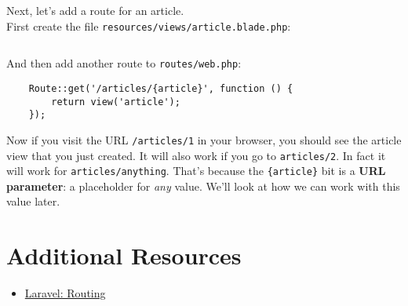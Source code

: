 Next, let's add a route for an article.
\\

First create the file \texttt{resources/views/article.blade.php}:

\inputminted{html}{05-routing/figures/02-article.html}

And then add another route to \texttt{routes/web.php}:

\begin{verbatim}
    Route::get('/articles/{article}', function () {
        return view('article');
    });
\end{verbatim}

Now if you visit the URL \texttt{/articles/1} in your browser, you should see the article view that you just created. It will also work if you go to \texttt{articles/2}. In fact it will work for \texttt{articles/anything}. That's because the \texttt{\{article\}} bit is a \textbf{URL parameter}: a placeholder for \textit{any} value. We'll look at how we can work with this value later.

\section{Additional Resources}

\begin{itemize}[leftmargin=*]
    \item \href{http://laravel.com/docs/master/routing}{Laravel: Routing}
\end{itemize}
